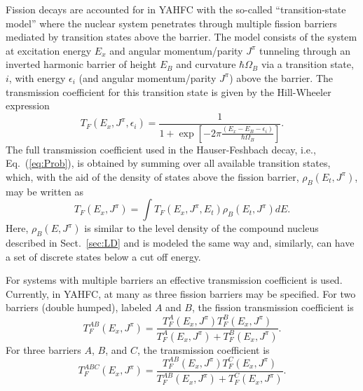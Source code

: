 \documentclass[
10pt,
showpacs,preprintnumbers,footinbib,
amsfonts,amsmath,amssymb,
aps,
prc,twocolumn,groupedaddress,superscriptaddress,
showkeys,
nofootinbib
]{revtex4-1}
\begin{document}
Fission decays are accounted for in YAHFC with the so-called ``transition-state model'' where the nuclear system penetrates through multiple fission barriers mediated by transition states above the barrier. The model consists of the system at excitation energy $E_x$ and angular momentum/parity $J^\pi$ tunneling  through an inverted harmonic barrier of height $E_B$ and curvature $\hbar\Omega_B$ via a transition state, $i$, with energy $\epsilon_i$ (and angular momentum/parity $J^\pi$) above the barrier. The transmission coefficient for this transition state is given by the Hill-Wheeler expression
\begin{equation}
T_F(E_x,J^\pi,\epsilon_i)  = \frac{1} { 1 + \exp\left [-2\pi\frac{(E_x - E_B - \epsilon_i) } {\hbar\Omega_B }\right ] }.
\end{equation}
The full transmission coefficient used in the Hauser-Feshbach decay, i.e., Eq.~(\ref{eq:Prob}), is obtained by summing over all available transition states, which, with the aid of the density of states above the fission barrier, $\rho_B(E_t,J^\pi)$, may be written as
\begin{equation}
T_F(E_x,J^\pi) = \int T_F(E_x,J^\pi,E_t) \rho_B(E_t,J^\pi)dE.
\end{equation}
Here, $\rho_B(E,J^\pi)$ is similar to the level density of the compound nucleus described in Sect.~\ref{sec:LD} and is modeled the same way and, similarly, can have a set of discrete states below a cut off energy. 

For systems with multiple barriers an effective transmission coefficient is used. Currently, in YAHFC, at many as three fission barriers may be specified. For two barriers (double humped), labeled $A$ and $B$, the fission transmission coefficient is
\begin{equation}
T_{F}^{AB}(E_x,J^\pi) = \frac{ T_{F}^{A}(E_x,J^\pi)T_{F}^{B}(E_x,J^\pi) } { T_{F}^{A}(E_x,J^\pi)+T_{F}^{B}(E_x,J^\pi)}.
\label{eq:Two-Barr}
\end{equation}
For three barriers $A$, $B$, and $C$, the transmission coefficient is
\begin{equation}
T_{F}^{ABC}(E_x,J^\pi) = \frac{ T_{F}^{AB}(E_x,J^\pi)T_{F}^{C}(E_x,J^\pi) } { T_{F}^{AB}(E_x,J^\pi)+T_{F}^{C}(E_x,J^\pi)}.
\end{equation}
\end{document}
